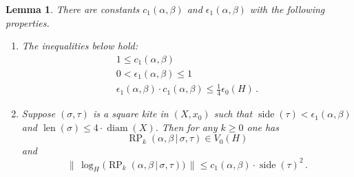 \documentclass[10pt, a4paper]{amsart}
\newtheorem{lem}[equation]{Lemma}
\theoremstyle{definition}
\numberwithin{equation}{section}
\newcommand{\opn}{\operatorname}
\newcommand{\rmitem}[1]{\item[\text{\textup{(#1)}}]}
\newcommand{\smfrac}[2]{{\textstyle \frac{#1}{#2}}}
\newcommand{\Norm}[1]{\bigl\lVert\, #1 \, \bigr\rVert}
\renewcommand{\vert}{\, | \,}
\begin{document}
\begin{lem} \label{lem:4}
There are constants $c_1(\alpha, \beta)$ and
$\epsilon_1(\alpha, \beta)$ with the following properties.
\begin{enumerate}
\rmitem{i} The inequalities below hold:
\begin{gather*}
1 \leq c_1(\alpha, \beta) \\
0 < \epsilon_1(\alpha, \beta) \leq 1 \\
\epsilon_1(\alpha, \beta) \cdot c_1(\alpha, \beta)
\leq \smfrac{1}{4} \epsilon_0(H) \, .
\end{gather*}

\rmitem{ii} Suppose $(\sigma, \tau)$ is a square kite in $(X, x_0)$
such that 
$\opn{side}(\tau) < \epsilon_1(\alpha, \beta)$
and
$\opn{len}(\sigma) \leq 4 \cdot \opn{diam}(X)$.
Then for any $k \geq 0$ one has  
\[ \opn{RP}_{k}(\alpha, \beta \vert \sigma, \tau) \in V_0(H) \]
and
\[ \Norm{ \opn{log}_H \bigl( \opn{RP}_{k}(\alpha, \beta \vert \sigma, \tau)
\bigr) } \leq 
c_1(\alpha, \beta) \cdot \opn{side}(\tau)^2 \, . \]
\end{enumerate}
\end{lem}
\end{document}
